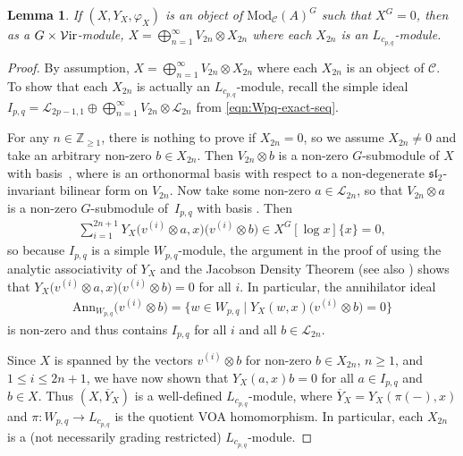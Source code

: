 \documentclass[pdftex]{sigma}
\numberwithin{equation}{section}
\newtheorem{Lemma}[Theorem]{Lemma}
\theoremstyle{definition}
\begin{document}
\begin{Lemma}\label{lem:no-G-inv}
If $(X,Y_X,\varphi_X)$ is an object of $\mathrm{Mod}_\mathcal{C}(A)^G$ such that $X^G=0$, then as a $G\times\mathcal{V}{\rm ir}$-module, $X =\bigoplus_{n=1}^\infty V_{2n}\otimes X_{2n}$ where each $X_{2n}$ is an $L_{c_{p,q}}$-module.
\end{Lemma}

\begin{proof}
By assumption, $X=\bigoplus_{n=1}^\infty V_{2n}\otimes X_{2n}$ where each $X_{2n}$ is an object of $\mathcal{C}$. To show that each $X_{2n}$ is actually an $L_{c_{p,q}}$-module, recall the simple ideal $I_{p,q}=\mathcal{L}_{2p-1,1}\oplus\bigoplus_{n=1}^\infty V_{2n}\otimes\mathcal{L}_{2n}$ from \eqref{eqn:Wpq-exact-seq}.

For any $n\in\mathbb{Z}_{\geq 1}$, there is nothing to prove if $X_{2n}=0$, so we assume $X_{2n}\neq 0$ and take an arbitrary non-zero $b\in X_{2n}$. Then $V_{2n}\otimes b$ is a non-zero $G$-submodule of $X$ with basis~, where  is an orthonormal basis with respect to a non-degenerate $\mathfrak{sl}_2$-invariant bilinear form on $V_{2n}$. Now take some non-zero $a\in\mathcal{L}_{2n}$, so that $V_{2n}\otimes a$ is a non-zero $G$-submodule of~$I_{p,q}$ with basis . Then
\begin{gather*}
\sum_{i=1}^{2n+1} Y_X\bigl(v^{(i)}\otimes a, x\bigr)\bigl(v^{(i)}\otimes b\bigr)\in X^G[\log x]\lbrace x \rbrace=0,
\end{gather*}
so because $I_{p,q}$ is a simple $W_{p,q}$-module, the argument in the proof of \cite[Lemma 4.18]{McR-G-equiv} using the analytic associativity of $Y_X$ and the Jacobson Density Theorem (see also \cite[Lemma 3.1]{DM}) shows that $Y_X\bigl(v^{(i)}\otimes a,x\bigr)\bigl(v^{(i)}\otimes b\bigr)=0$ for all $i$. In particular, the annihilator ideal
\begin{gather*}
\mathrm{Ann}_{W_{p,q}}\bigl(v^{(i)}\otimes b\bigr) =\big\lbrace w\in W_{p,q}\mid Y_X(w,x)\bigl(v^{(i)}\otimes b\bigr) = 0\big\rbrace
\end{gather*}
is non-zero and thus contains $I_{p,q}$ for all $i$ and all $b\in\mathcal{L}_{2n}$.

Since $X$ is spanned by the vectors $v^{(i)}\otimes b$ for non-zero $b\in X_{2n}$, $n\geq 1$, and $1\leq i\leq 2n+1$, we have now shown that $Y_X(a,x)b=0$ for all $a\in I_{p,q}$ and $b\in X$. Thus $(X,\overline{Y}_X)$ is a well-defined $L_{c_{p,q}}$-module, where $\overline{Y}_X=Y_X(\pi(-),x)$ and $\pi\colon W_{p,q}\rightarrow L_{c_{p,q}}$ is the quotient VOA homomorphism. In particular, each $X_{2n}$ is a (not necessarily grading restricted) $L_{c_{p,q}}$-module.
\end{proof}
\end{document}
